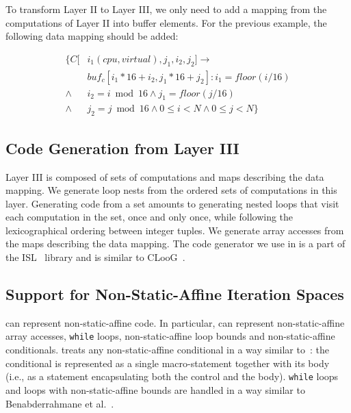To transform Layer II to Layer III, we only need to add a mapping from the computations of Layer II into buffer elements.
For the previous example, the following data mapping should be added:

\begin{align*}
\{C[ & i_1 (cpu, virtual), j_1, i_2, j_2] \rightarrow \\
     & buf_c[i_1*16+i_2, j_1*16+j_2]: i_1=floor(i/16) \\
     \wedge & i_2=i\bmod 16 \wedge j_1=floor(j/16) \\
     \wedge & j_2=j\bmod 16 \wedge 0\leq i < N \wedge 0\leq j < N \}
\end{align*}

\subsection{Code Generation from Layer III}

Layer III is composed of sets of computations and maps describing the data mapping.  We generate loop nests from the ordered sets of computations in this layer.  Generating code from a set amounts to generating nested loops that visit each computation in the set, once and only once, while following the lexicographical ordering between integer tuples.
We generate array accesses from the maps describing the data mapping.  The code generator we use in \framework is a part of the ISL~\cite{verdoolaege_isl:_2010} library and is similar to CLooG~\cite{Bastoul:2004:CGP:1025127.1025992}.


\subsection{Support for Non-Static-Affine Iteration Spaces}

\framework can represent non-static-affine code.  In particular, \framework{} can represent non-static-affine array accesses, \texttt{while} loops, non-static-affine loop bounds and non-static-affine conditionals.
\framework treats any non-static-affine conditional in a way similar to~\cite{pencil}: the conditional is represented as a single macro-statement together with its body (i.e., as a statement encapsulating both the control and the body).  \texttt{while} loops and loops with non-static-affine bounds are handled in a way similar to Benabderrahmane et al.~\cite{Benabderrahmane}.



